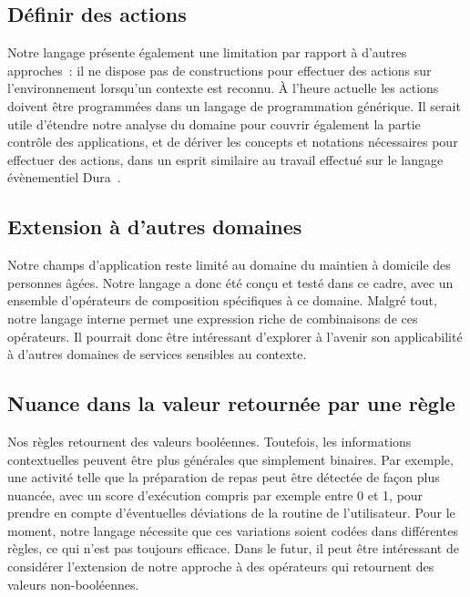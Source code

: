 

\subsection*{Définir des actions}
Notre langage présente également une limitation par rapport à d'autres approches~: il ne dispose pas de constructions pour effectuer des actions sur l'environnement lorsqu'un contexte est reconnu. À l'heure actuelle les actions doivent être programmées dans un langage de programmation générique. Il serait utile d'étendre notre analyse du domaine pour couvrir également la partie contrôle des applications, et de dériver les concepts et notations nécessaires pour effectuer des actions, dans un esprit similaire au travail effectué sur le langage évènementiel Dura~.

\subsection*{Extension à d'autres domaines}
Notre champs d'application reste limité au domaine du maintien à domicile des personnes âgées. Notre langage a donc été conçu et testé dans ce cadre, avec un ensemble d'opérateurs de composition spécifiques à ce domaine. Malgré tout, notre langage interne permet une expression riche de combinaisons de ces opérateurs. Il pourrait donc être intéressant d'explorer à l'avenir son applicabilité à d'autres domaines de services sensibles au contexte.

\subsection*{Nuance dans la valeur retournée par une règle}
Nos règles retournent des valeurs booléennes. Toutefois, les informations contextuelles peuvent être plus générales que simplement binaires. Par exemple, une activité telle que la préparation de repas peut être détectée de façon plus nuancée, avec un score d'exécution compris par exemple entre 0 et 1, pour prendre en compte d'éventuelles déviations de la routine de l'utilisateur. Pour le moment, notre langage nécessite que ces variations soient codées dans différentes règles, ce qui n'est pas toujours efficace. Dans le futur, il peut être intéressant de considérer l'extension de notre approche à des opérateurs qui retournent des valeurs non-booléennes.

